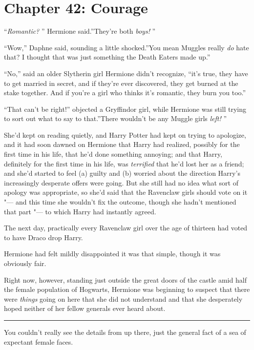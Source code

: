 \chapter{Chapter 42: Courage}
``\emph{Romantic?} '' Hermione said.''They're both \emph{boys!} ''

``Wow,'' Daphne said, sounding a little shocked.''You mean Muggles
really \emph{do} hate that? I thought that was just something the Death
Eaters made up.''

``No,'' said an older Slytherin girl Hermione didn't recognize, ``it's
true, they have to get married in secret, and if they're ever
discovered, they get burned at the stake together. And if you're a girl
who thinks it's romantic, they burn you too.''

``That can't be right!'' objected a Gryffindor girl, while Hermione was
still trying to sort out what to say to that.''There wouldn't be any
Muggle girls \emph{left!} ''

She'd kept on reading quietly, and Harry Potter had kept on trying to
apologize, and it had soon dawned on Hermione that Harry had realized,
possibly for the first time in his life, that he'd done something
annoying; and that Harry, definitely for the first time in his life, was
\emph{terrified} that he'd lost her as a friend; and she'd started to
feel (a) guilty and (b) worried about the direction Harry's increasingly
desperate offers were going. But she still had no idea what sort of
apology was appropriate, so she'd said that the Ravenclaw girls should
vote on it "--- and this time she wouldn't fix the outcome, though she
hadn't mentioned that part "--- to which Harry had instantly agreed.

The next day, practically every Ravenclaw girl over the age of thirteen
had voted to have Draco drop Harry.

Hermione had felt mildly disappointed it was that simple, though it was
obviously fair.

Right now, however, standing just outside the great doors of the castle
amid half the female population of Hogwarts, Hermione was beginning to
suspect that there were \emph{things} going on here that she did not
understand and that she desperately hoped neither of her fellow generals
ever heard about.

\begin{center}\rule{3in}{0.4pt}\end{center}

You couldn't really see the details from up there, just the general fact
of a sea of expectant female faces.

